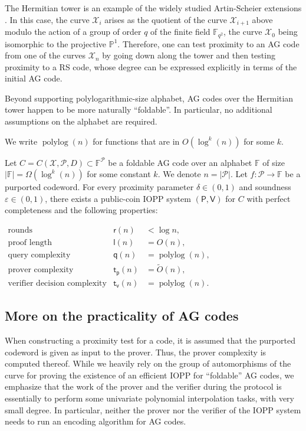 \documentclass[10pt,a4paper]{article}
\renewcommand\epsilon{\varepsilon}
\newcommand\F{\mathbb{F}}
\newcommand\PP{\mathbb{P}}
\DeclareMathOperator{\polylog}{polylog}
\newcommand\prover{\mathsf{P}}
\newcommand\verifier{\mathsf{V}}
\newcommand{\size}[1]{\left|#1\right|}
\newcommand\calX{\mathcal{X}}
\newcommand\calP{\mathcal{P}}
\theoremstyle{plain}
\theoremstyle{plain}
\theoremstyle{definition}
\theoremstyle{remark}
\theoremstyle{plain}
\begin{document}
The Hermitian tower is an example of the widely studied Artin-Scheier extensions \cite{L92,S08}. In this case, the curve $\calX_i$ arises as the quotient of the curve $\calX_{i+1}$ above modulo the action of a group of order $q$ of the finite field $\F_{q^2}$, the curve $\calX_0$ being isomorphic to the projective $\PP^1$. Therefore, one can test proximity to an AG code from one of the curves $\calX_n$ by going down along the tower and then testing proximity to a RS code, whose degree can be expressed explicitly in terms of the initial AG code. 

Beyond supporting polylogarithmic-size alphabet, AG codes over the Hermitian tower happen to be more naturally ``foldable''. In particular, no additional assumptions on the alphabet are required.

We write $\polylog(n)$ for functions that are in $O\left(\log^k(n)\right)$ for some $k$.

\begin{theorem}\label{thm:intro-tower} 
	Let ${C = C(\calX, \calP, D)} \subset \F^{\calP}$ be a foldable AG code over an alphabet $\F$ of size $\size \F = \Omega(\log^k(n))$ for some constant $k$.
	We denote $n = \size{\calP}$. Let $f : \calP \rightarrow \F$ be a purported codeword. For every proximity parameter $\delta \in (0, 1)$ and soundness $\epsilon \in (0,1)$, there exists a public-coin IOPP system $(\prover, \verifier)$ for $C$ with perfect completeness and the following properties:
	
	$
	\begin{array}{lll}
		\text{rounds} &\mathsf{r}(n) &< \log n,\\
		\text{proof length} &\mathsf{l}(n) &= O(n),\\
		\text{query complexity} &\mathsf{q}(n) &= \polylog(n),\\
		\text{prover complexity} &\mathsf{t_p}(n) &= \widetilde{O}(n),\\
		\text{verifier decision complexity} & \mathsf{t_v}(n) &= \polylog(n).
	\end{array}
	$
\end{theorem}

\subsection{More on the practicality of AG codes}\label{subsec:ag-encoding}
When constructing a proximity test for a code, it is assumed that the purported codeword is given as input to the prover. Thus, the prover complexity is computed thereof. While we heavily rely on the group of automorphisms of the curve for proving the existence of an efficient IOPP for ``foldable'' AG codes, we emphasize that the work of the prover and the verifier during the protocol is essentially to perform some univariate polynomial interpolation tasks, with very small degree. In particular, neither the prover nor the verifier of the IOPP system needs to run an encoding algorithm for AG codes.
\end{document}
